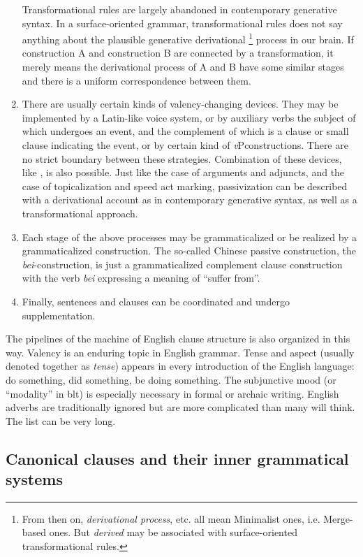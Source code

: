 \documentclass{article}
\newcommand*{\term}[1]{\emph{#1}}
\newcommand*{\corpus}[1]{\emph{#1}}
\newcommand*{\vP}{\textit{v}P}
\begin{document}
\begin{enumerate}
    Transformational rules are largely abandoned in contemporary generative syntax.
    In a surface-oriented grammar, 
    transformational rules does not say anything about the plausible generative derivational%
    \footnote{From then on, \term{derivational process}, etc. all mean Minimalist ones, i.e. Merge-based ones. 
    But \term{derived} may be associated with surface-oriented transformational rules.} process in our brain.
    If construction A and construction B are connected by a transformation,
    it merely means the derivational process of A and B have some similar stages 
    and there is a uniform correspondence between them. 
    \item There are usually certain kinds of valency-changing devices. 
    They may be implemented by a Latin-like voice system, 
    or by auxiliary verbs the subject of which undergoes an event,
    and the complement of which is a clause or small clause indicating the event,
    or by certain kind of \vP constructions.
    There are no strict boundary between these strategies.
    Combination of these devices, like \citet{collins2005pass}, is also possible.
    Just like the case of arguments and adjuncts, and the case of topicalization and speed act marking,
    passivization can be described with a derivational account as in contemporary generative syntax,
    as well as a transformational approach.
    \item Each stage of the above processes may be grammaticalized or be realized by a grammaticalized construction.
    The so-called Chinese passive construction, the \corpus{bei}-construction,
    is just a grammaticalized complement clause construction 
    with the verb \corpus{bei} expressing a meaning of ``suffer from''. 
    \item Finally, sentences and clauses can be coordinated and undergo supplementation. 
\end{enumerate}

The pipelines of the machine of English clause structure is also organized in this way. 
Valency is an enduring topic in English grammar.
Tense and aspect (usually denoted together as \term{tense}) appears 
in every introduction of the English language:
do something, did something, be doing something.
The subjunctive mood (or ``modality'' in \ac{blt}) is especially necessary in formal or archaic writing.
English adverbs are traditionally ignored but are more complicated than many will think.
The list can be very long.

\subsection{Canonical clauses and their inner grammatical systems}
\end{document}
